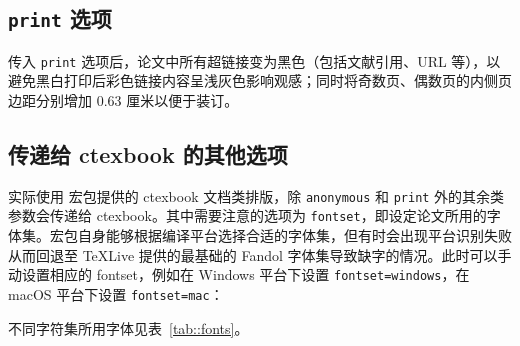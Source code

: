 \documentclass[bachelor, comfort]{shtthesis}
\begin{document}
\subsection{\texttt{print} 选项}
传入 \verb|print| 选项后，论文中所有超链接变为黑色（包括文献引用、URL 等），以避免黑白打印后彩色链接内容呈浅灰色影响观感；同时将奇数页、偶数页的内侧页边距分别增加 0.63 厘米以便于装订。

\subsection{传递给 \textsf{ctexbook} 的其他选项}
\shtthesis 实际使用 \CTeX 宏包提供的 \textsf{ctexbook} 文档类排版，除 \verb|anonymous| 和 \verb|print| 外的其余类参数会传递给 \textsf{ctexbook}。其中需要注意的选项为 \verb|fontset|，即设定论文所用的字体集。\CTeX 宏包自身能够根据编译平台选择合适的字体集，但有时会出现平台识别失败从而回退至 \TeX Live 提供的最基础的 Fandol 字体集导致缺字的情况。此时可以手动设置相应的 fontset，例如在 Windows 平台下设置 \verb|fontset=windows|，在 macOS 平台下设置 \verb|fontset=mac|：
不同字符集所用字体见表~\ref{tab::fonts}。
\end{document}
